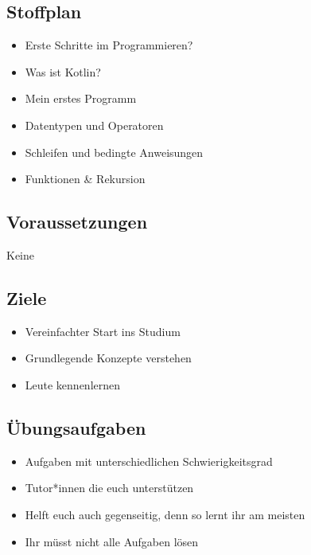 \subsection{Stoffplan}
\begin{frame}
    \slidehead
    \begin{itemize}
        \item Erste Schritte im Programmieren?
        \item Was ist Kotlin?
        \item Mein erstes Programm
        \item Datentypen und Operatoren
        \item Schleifen und bedingte Anweisungen
        \item Funktionen \& Rekursion
    \end{itemize}
\end{frame}

\subsection{Voraussetzungen}
\begin{frame}
    \slidehead
    \centering
    \vspace{1.5cm}
    \Huge Keine
\end{frame}

\subsection{Ziele}
\begin{frame}
    \slidehead
    \begin{itemize}
        \item Vereinfachter Start ins Studium
        \item Grundlegende Konzepte verstehen
        \item Leute kennenlernen

    \end{itemize}
\end{frame}

\subsection{Übungsaufgaben}
\begin{frame}
    \slidehead
    \begin{itemize}
        \item Aufgaben mit unterschiedlichen Schwierigkeitsgrad
        \item Tutor*innen
            die euch unterstützen
        \item Helft euch auch gegenseitig, denn so lernt ihr am meisten
        \item Ihr müsst nicht alle Aufgaben lösen
    \end{itemize}
\end{frame}


